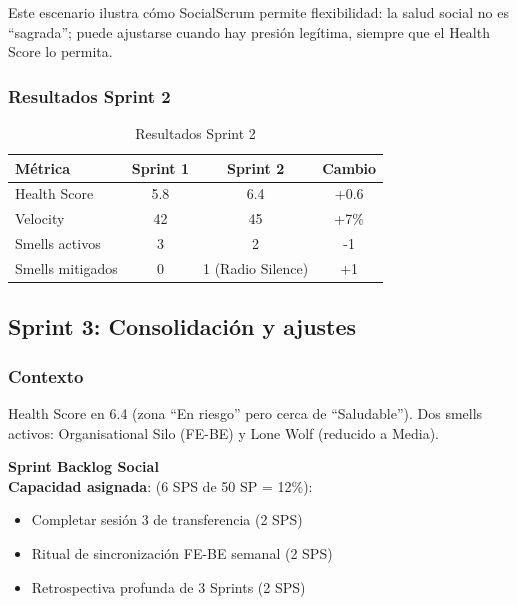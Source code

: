 Este escenario ilustra cómo SocialScrum permite flexibilidad: la salud social no es ``sagrada''; puede ajustarse cuando hay presión legítima, siempre que el Health Score lo permita.

\subsubsection{Resultados Sprint 2}

\begin{table}[h]
    \centering
    \small
    \begin{tabularx}{\textwidth}{|X|c|c|c|}
        \hline
        \textbf{Métrica} & \textbf{Sprint 1} & \textbf{Sprint 2} & \textbf{Cambio} \\
        \hline
        Health Score     & 5.8               & 6.4               & +0.6            \\
        \hline
        Velocity         & 42                & 45                & +7\%            \\
        \hline
        Smells activos   & 3                 & 2                 & -1              \\
        \hline
        Smells mitigados & 0                 & 1 (Radio Silence) & +1              \\
        \hline
    \end{tabularx}
    \caption{Resultados Sprint 2}
    \label{tab:resultados-sprint2}
\end{table}
\FloatBarrier

\subsection{Sprint 3: Consolidación y ajustes}

\subsubsection{Contexto}

Health Score en 6.4 (zona ``En riesgo'' pero cerca de ``Saludable''). Dos smells activos: Organisational Silo (FE-BE) y Lone Wolf (reducido a Media).

\textbf{Sprint Backlog Social}\mbox{}\\[-0.3\baselineskip]

\textbf{Capacidad asignada}: (6 SPS de 50 SP = 12\%):
\begin{itemize}
    \item Completar sesión 3 de transferencia (2 SPS)
    \item Ritual de sincronización FE-BE semanal (2 SPS)
    \item Retrospectiva profunda de 3 Sprints (2 SPS)
\end{itemize}

